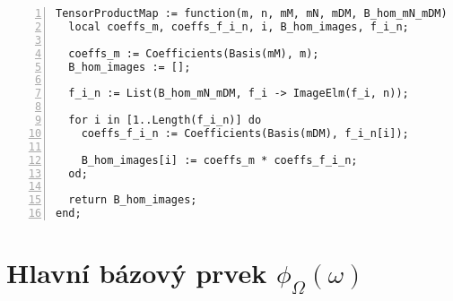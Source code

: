       \begin{Verbatim}[frame=single,numbers=left]
 TensorProductMap := function(m, n, mM, mN, mDM, B_hom_mN_mDM)
  local coeffs_m, coeffs_f_i_n, i, B_hom_images, f_i_n;

  coeffs_m := Coefficients(Basis(mM), m);
  B_hom_images := [];

  f_i_n := List(B_hom_mN_mDM, f_i -> ImageElm(f_i, n));

  for i in [1..Length(f_i_n)] do
    coeffs_f_i_n := Coefficients(Basis(mDM), f_i_n[i]);

    B_hom_images[i] := coeffs_m * coeffs_f_i_n;
  od;

  return B_hom_images;
end;
      \end{Verbatim}

  \section{Hlavní bázový prvek $\phi_\Omega(\omega)$}
  

